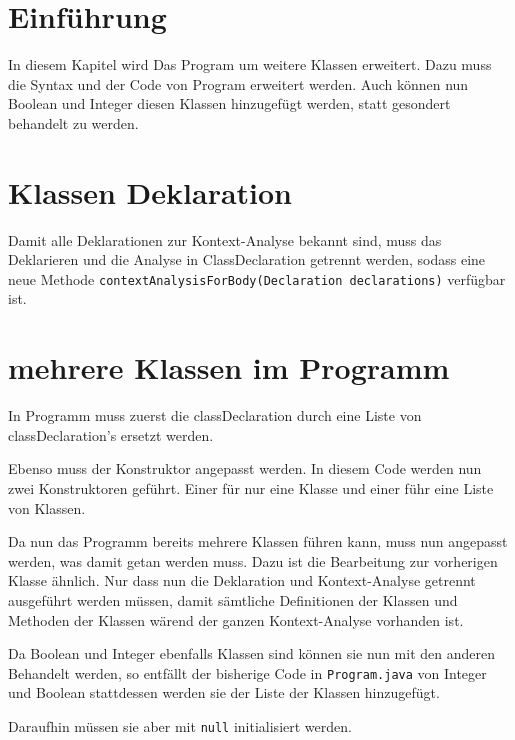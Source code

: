 \section{Einführung}
In diesem Kapitel wird Das Program um weitere Klassen erweitert.
Dazu muss die Syntax und der Code von Program erweitert werden.
Auch können nun Boolean und Integer diesen Klassen hinzugefügt werden, statt gesondert behandelt zu werden.

\section{Klassen Deklaration}
Damit alle Deklarationen zur Kontext-Analyse bekannt sind, muss das Deklarieren und die Analyse in ClassDeclaration getrennt werden,
 sodass  eine neue Methode \verb|contextAnalysisForBody(Declaration declarations)| verfügbar ist.


\section{mehrere Klassen im Programm}
In Programm muss zuerst die classDeclaration durch eine Liste von classDeclaration's ersetzt werden.

Ebenso muss der Konstruktor angepasst werden. In diesem Code werden nun zwei Konstruktoren geführt. Einer für nur eine Klasse und einer führ eine Liste von Klassen.

Da nun das Programm bereits mehrere Klassen führen kann, muss nun angepasst werden, was damit getan werden muss.
Dazu ist die Bearbeitung zur vorherigen Klasse ähnlich. Nur dass nun die Deklaration und Kontext-Analyse getrennt ausgeführt werden müssen, damit sämtliche Definitionen der Klassen und Methoden der Klassen wärend der ganzen Kontext-Analyse vorhanden ist.


Da Boolean und Integer ebenfalls Klassen sind können sie nun mit den anderen Behandelt werden, so entfällt der bisherige Code in \verb|Program.java| von Integer und Boolean stattdessen werden sie der Liste der Klassen hinzugefügt.

Daraufhin müssen sie aber mit \verb|null| initialisiert werden.


